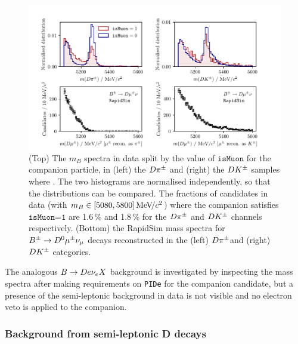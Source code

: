 \begin{figure}[tb]
    \centering
    \includegraphics[width=\columnwidth]{figures/analysis/background_checks/b2dmunu_plot.pdf}
    \caption{(Top) The $m_B$ spectra in data split by the value of $\texttt{isMuon}$ for the companion particle, in (left) the $D\pi^\pm$ and (right) the ${{D}{{K}^\pm}}$ samples where \DtoKspipi. The two histograms are normalised independently, so that the distributions can be compared. The fractions of candidates in data (with $m_B\in[5080, 5800]\text{\,Me\kern -0.1em V\!/}c^2$) where the companion satisfies $\texttt{isMuon=1}$ are 1.6\,\% and 1.8\,\% for the $D\pi^\pm$ and ${{D}{{K}^\pm}}$ channels respectively. (Bottom) the RapidSim mass spectra for ${{B}^\pm}\rightarrow{\ensuremath{{D}^0}}{\ensuremath{\mu^\pm}}\nu_\mu$ decays reconstructed in the (left) $D\pi^\pm $and (right) ${{D}{{K}^\pm}}$ categories.}
    \label{fig:semileptonic_B_check_mu}
\end{figure}

The analogous ${B}\rightarrow{\ensuremath{D}} e\nu_e X$ background is investigated by inspecting the \B mass spectra after making requirements on \texttt{PIDe} for the companion candidate, but a presence of the semi-leptonic background in data is not visible and no electron veto is applied to the companion.


\subsubsection{Background from semi-leptonic D decays} %
\label{ssub:background_from_semi_leptonic_d_decays}

